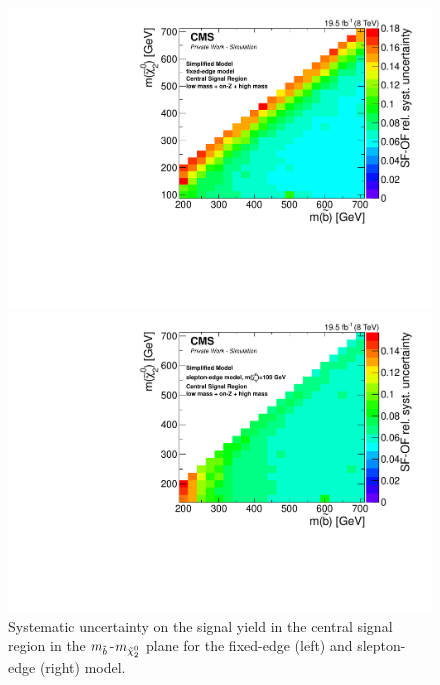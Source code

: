 \begin{figure}[t]
\centering
\begin{minipage}[t]{0.49\textwidth}
  \includegraphics[width=\textwidth]{plots/limits/T6bblledge_70_GeV_Edge_Barrel_syst_err.pdf}
\end{minipage}
\begin{minipage}[t]{0.49\textwidth}
\includegraphics[width=\textwidth]{plots/limits/T6bbllslepton_m_n_1_100_Barrel_syst_err_Reweighted.pdf}
\end{minipage}
\caption{Systematic uncertainty on the signal yield in the central signal region in the $m_{\tilde{b}}$-$m_{{\tilde{\chi}^0_2}}$ plane for the fixed-edge (left) and slepton-edge (right) model.}
\label{fig:sys}
\end{figure}
